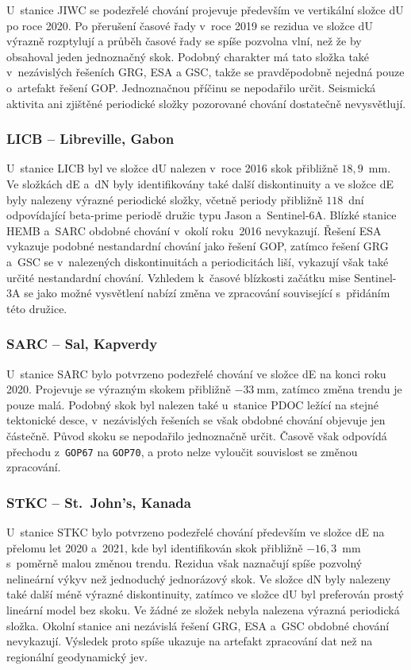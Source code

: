 U~stanice JIWC se podezřelé chování projevuje především ve vertikální složce dU po roce 2020. Po přerušení časové řady v~roce 2019 se rezidua ve složce dU výrazně rozptylují a průběh časové řady se spíše pozvolna vlní, než že by obsahoval jeden jednoznačný skok. Podobný charakter má tato složka také v~nezávislých řešeních GRG, ESA a GSC, takže se pravděpodobně nejedná pouze o~artefakt řešení GOP. Jednoznačnou příčinu se nepodařilo určit. Seismická aktivita ani zjištěné periodické složky pozorované chování dostatečně nevysvětlují.

\subsubsection{LICB -- Libreville, Gabon}

U~stanice LICB byl ve složce dU nalezen v~roce 2016 skok přibližně $18{,}9$~mm. Ve složkách dE a~dN byly identifikovány také další diskontinuity a ve složce dE byly nalezeny výrazné periodické složky, včetně periody přibližně $118$~dní odpovídající beta-prime periodě družic typu Jason a~Sentinel-6A. Blízké stanice HEMB a~SARC obdobné chování v~okolí roku~2016 nevykazují. Řešení ESA vykazuje podobné nestandardní chování jako řešení GOP, zatímco řešení GRG a~GSC se v~nalezených diskontinuitách a periodicitách liší, vykazují však také určité nestandardní chování. Vzhledem k~časové blízkosti začátku mise Sentinel-3A se jako možné vysvětlení nabízí změna ve zpracování související s~přidáním této družice.

\subsubsection{SARC -- Sal, Kapverdy}

U~stanice SARC bylo potvrzeno podezřelé chování ve složce dE na konci roku 2020. Projevuje se výrazným skokem přibližně \(-33~\mathrm{mm}\), zatímco změna trendu je pouze malá. Podobný skok byl nalezen také u~stanice PDOC ležící na stejné tektonické desce, v~nezávislých řešeních se však obdobné chování objevuje jen částečně. Původ skoku se nepodařilo jedno\-značně určit. Časově však odpovídá přechodu z~\texttt{GOP67} na \texttt{GOP70}, a proto nelze vyloučit souvislost se změnou zpracování.

\subsubsection{STKC -- St.~John's, Kanada}

U~stanice STKC bylo potvrzeno podezřelé chování především ve složce dE na přelomu let 2020 a~2021, kde byl identifikován skok přibližně $-16{,}3$~mm s~poměrně malou změnou trendu. Rezidua však naznačují spíše pozvolný nelineární výkyv než jednoduchý jednorázový skok. Ve složce dN byly nalezeny také další méně výrazné diskontinuity, zatímco ve složce dU byl preferován prostý lineární model bez skoku. Ve žádné ze složek nebyla nalezena výrazná periodická složka. Okolní stanice ani nezávislá řešení GRG, ESA a~GSC obdobné chování nevykazují. Výsledek proto spíše ukazuje na artefakt zpracování dat než na regionální geodynamický jev.


